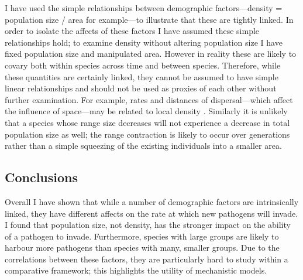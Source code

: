 
I have used the simple relationships between demographic factors---density = population size / area for example---to illustrate that these are tightly linked.
In order to isolate the affects of these factors I have assumed these simple relationships hold; to examine density without altering population size I have fixed population size and manipulated area.
However in reality these are likely to covary both within species across time and between species.
Therefore, while these quantities are certainly linked, they cannot be assumed to have simple linear relationships and should not be used as proxies of each other without further examination.
For example, rates and distances of dispersal---which affect the influence of space---may be related to local density \cite{marjamaki2013local}.
Similarly it is unlikely that a species whose range size decreases will not experience a decrease in total population size as well; the range contraction is likely to occur over generations rather than a simple squeezing of the existing individuals into a smaller area.




\subsection{Conclusions}

Overall I have shown that while a number of demographic factors are intrinsically linked, they have different affects on the rate at which new pathogens will invade.
I found that population size, not density, has the stronger impact on the ability of a pathogen to invade.
Furthermore, species with large groups are likely to harbour more pathogens than species with many, smaller groups.
Due to the correlations between these factors, they are particularly hard to study within a comparative framework; this highlights the utility of mechanistic models.











